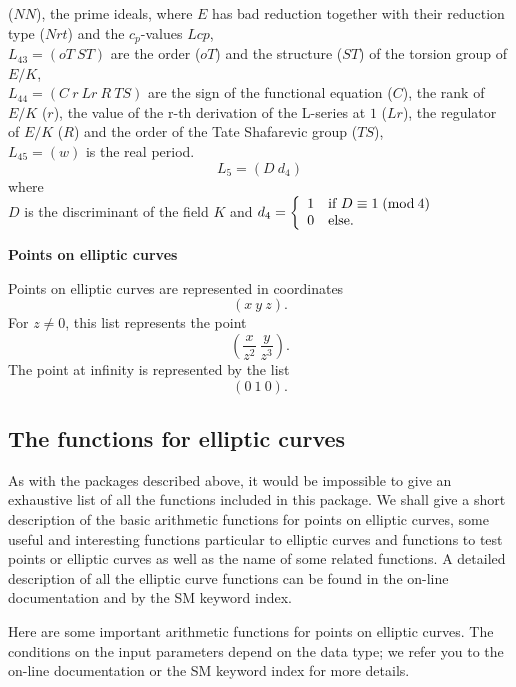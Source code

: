 ($NN$), the prime ideals, where $E$ has bad reduction together with their reduction type ($Nrt$) and the $c_p$-values $Lcp$, \\
$L_{43} = (oT\  ST)$ are the order ($oT$) and the structure ($ST$) of the 
torsion group of $E/K$,\\
$L_{44} = (C\  r\  Lr\  R\  TS)$ are the sign of the functional equation
($C$), the rank of $E/K$ ($r$), the value of the r-th derivation of the 
L-series at $1$ ($Lr$), the regulator of $E/K$ ($R$) and the order of the
Tate Shafarevic group ($TS$), \\
$L_{45} = (w)$ is the real period.
\leer
$$
        L_5 = (D\ d_4)
$$
where \\
$D$ is the discriminant of the field $K$ and 
$d_4 = \left\{\begin{array}{ll}
                1 & \mbox{if } D \equiv 1\; ({\rm mod}\: 4) \\
                0 & \mbox{else.} 
        \end{array}\right.$

{\bf Points on elliptic curves}

Points on elliptic curves are represented in coordinates
$$
        (x\ y\ z).
$$
For $z\not= 0$, this list represents the point 
$$
        \left(\frac{x}{z^2}\ \frac{y}{z^3}\right).
$$
The point at infinity is represented by the list
$$
        (0\ 1\ 0).
$$

\newpage


\subsection{The functions for elliptic curves}

As with the packages described above, it would be impossible to give an 
exhaustive list of all the functions included in this package. We shall give a 
short description of the basic arithmetic functions for points on elliptic 
curves, some useful and interesting functions particular to elliptic curves and 
functions to test points or elliptic curves as well as the name of some related 
functions. A detailed description of all the elliptic curve functions can be 
found in the on-line documentation and by the SM keyword index.

Here are some important arithmetic functions for points on elliptic curves. The 
conditions on the input par\-ameters depend on the data type;
we refer you to the on-line documentation or the SM keyword index for more 
details.

